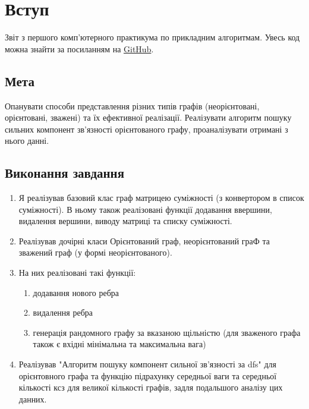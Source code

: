 \documentclass{article}
\begin{document}



\raggedright
\section{Вступ}

Звіт з першого комп'ютерного практикума по прикладним алгоритмам. Увесь код можна знайти за посиланням на \href{https://github.com/lol1chan}{GitHub}.

\subsection{Мета}
Опанувати способи представлення різних типів графів (неорієнтовані, орієнтовані, зважені) та їх ефективної реалізації. Реалізувати алгоритм пошуку сильних компонент зв'язності орієнтованого графу, проаналізувати отримані з нього данні. 

\subsection{Виконання завдання}
\begin{enumerate}
\item Я реалізував базовий клас граф матрицею суміжності (з конвертором в список суміжності). В ньому також реалізовані функції додавання ввершини, видалення вершини, виводу матриці та списку суміжності. 
\item Реалізував дочірні класи Орієнтований граф, неорієнтований граФ та зважений граф (у формі неорієнтованого). 

\item На них реалізовані такі функції:

\begin{enumerate}

\item додавання нового ребра
\item видалення ребра
\item генерація рандомного графу за вказаною щільністю (для зваженого графа також є вхідні мінімальна та максимальна вага)

\end{enumerate}

\item Реалізував "Алгоритм пошуку компонент сильної зв'язності за dfs" для орієнтовного графа та функцію підрахунку середньої ваги та середньої кількості ксз для великої кількості графів, задля подальшого аналізу цих данних. 
\end{enumerate}
\end{document}
